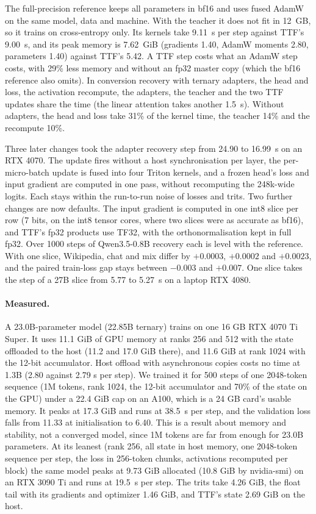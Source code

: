 \documentclass[10pt,twocolumn]{article}
\begin{document}
The full-precision reference keeps all parameters in bf16 and uses fused AdamW on the same model, data and machine.
With the teacher it does not fit in 12~GB, so it trains on cross-entropy only. Its kernels take 9.11~s per step against
TTF's 9.00~s, and its peak memory is 7.62~GiB (gradients 1.40, AdamW moments 2.80, parameters 1.40) against TTF's 5.42.
A TTF step costs what an AdamW step costs, with 29\% less memory and without an fp32 master copy (which the bf16
reference also omits). In conversion recovery with ternary adapters, the head and loss, the activation recompute, the
adapters, the teacher and the two TTF updates share the time (the linear attention takes another 1.5~s). Without
adapters, the head and loss take 31\% of the kernel time, the teacher 14\% and the recompute 10\%.

Three later changes took the adapter recovery step from 24.90 to 16.99~s on an RTX 4070. The update fires without
a host synchronisation per layer, the per-micro-batch update is fused into four Triton kernels, and a frozen head's
loss and input gradient are computed in one pass, without recomputing the 248k-wide logits. Each stays within the run-to-run noise of
losses and trits. Two further changes are now defaults. The input gradient is computed in one int8 slice per row (7
bits, on the int8 tensor cores, where two slices were as accurate as bf16), and TTF's fp32 products use TF32, with the
orthonormalisation kept in full fp32. Over 1000 steps of Qwen3.5-0.8B recovery each is level with the reference. With
one slice, Wikipedia, chat and mix differ by $+0.0003$, $+0.0002$ and $+0.0023$, and the paired train-loss gap stays
between $-0.003$ and $+0.007$. One slice takes the step of a 27B slice from 5.77 to 5.27~s on a laptop RTX 4080.

\paragraph{Measured.} A 23.0B-parameter model (22.85B ternary) trains on one 16 GB RTX 4070 Ti Super. It uses 11.1 GiB of
GPU memory at ranks 256 and 512 with the state offloaded to the host (11.2 and 17.0 GiB there), and 11.6 GiB at rank
1024 with the 12-bit accumulator. Host offload with asynchronous copies costs no time at 1.3B (2.80 against 2.79 s per
step). We trained it for 500 steps of one 2048-token sequence (1M tokens, rank 1024, the 12-bit accumulator and 70\% of the
state on the GPU) under a 22.4 GiB cap on an A100, which is a 24 GB card's usable memory. It peaks at 17.3 GiB and runs
at 38.5~s per step, and the validation loss falls from 11.33 at initialisation to 6.40. This is a result about memory
and stability, not a converged model, since 1M tokens are far from enough for 23.0B parameters. At its leanest (rank
256, all state in host memory, one 2048-token sequence per step, the loss in 256-token chunks, activations recomputed
per block) the same model peaks at 9.73 GiB allocated (10.8 GiB by nvidia-smi) on an RTX 3090 Ti and runs at 19.5~s per
step. The trits take 4.26 GiB, the float tail with its gradients and optimizer 1.46 GiB, and TTF's state 2.69 GiB on
the host.
\end{document}
